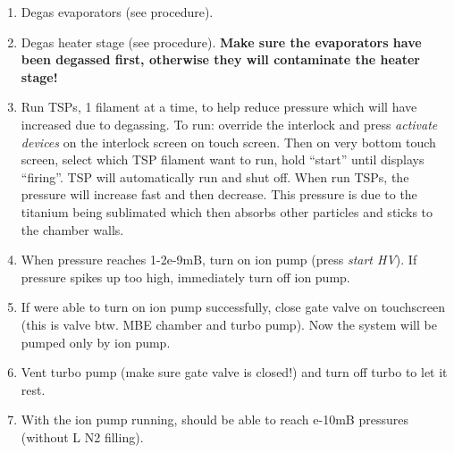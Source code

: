 \begin{enumerate}
\item	Degas evaporators (see procedure). 
\item	Degas heater stage (see procedure). \textbf{Make sure the evaporators have been degassed first, otherwise they will contaminate the heater stage!}
\item	Run TSPs, 1 filament at a time, to help reduce pressure which will have increased due to degassing.  To run: override the interlock and press \emph{activate devices} on the interlock screen on touch screen. Then on very bottom touch screen, select which TSP filament want to run, hold “start” until displays “firing”. TSP will automatically run and shut off. When run TSPs, the pressure will increase fast and then decrease. This pressure is due to the titanium being sublimated which then absorbs other particles and sticks to the chamber walls.
\item	When pressure reaches 1-2e-9mB, turn on ion pump (press \emph{start HV}). If pressure spikes up too high, immediately turn off ion pump. 
\item	If were able to turn on ion pump successfully, close gate valve on touchscreen (this is valve btw. MBE chamber and turbo pump). Now the system will be pumped only by ion pump.
\item	Vent turbo pump (make sure gate valve is closed!) and turn off turbo to let it rest.
\item	With the ion pump running, should be able to reach e-10mB pressures (without L N2 filling).
\end{enumerate}

